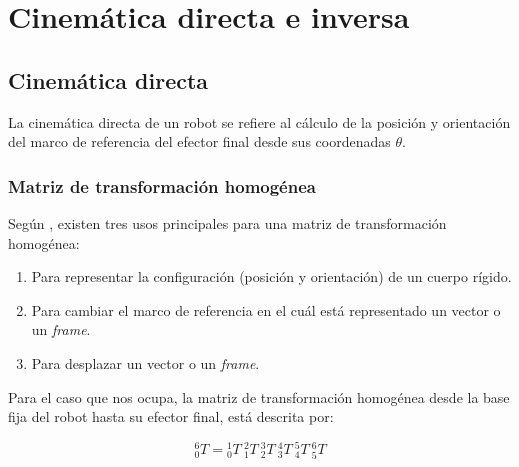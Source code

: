 \section{Cinemática directa e inversa}
\subsection{Cinemática directa}

La cinemática directa de un robot se refiere al cálculo de la posición y orientación del marco de referencia del efector final desde sus coordenadas $\theta$. \cite{University2017}

\subsubsection{Matriz de transformación homogénea}

Según \cite{University2017}, existen tres usos principales para una matriz de transformación homogénea:

\begin{enumerate}
  \item Para representar la configuración (posición y orientación) de un cuerpo rígido.
  \item Para cambiar el marco de referencia en el cuál está representado un vector o un \textit{frame}.
  \item Para desplazar un vector o un \textit{frame}.
\end{enumerate}

Para el caso que nos ocupa, la matriz de transformación homogénea desde la base fija del robot hasta su efector final, está descrita por:

\begin{equation}
\label{eq:forwardkinematicequation}
{}_{0}^{6}T = {}_{0}^{1}T \ {}_{1}^{2}T \ {}_{2}^{3}T \ {}_{3}^{4}T \ {}_{4}^{5}T \ {}_{5}^{6}T 
\end{equation}

